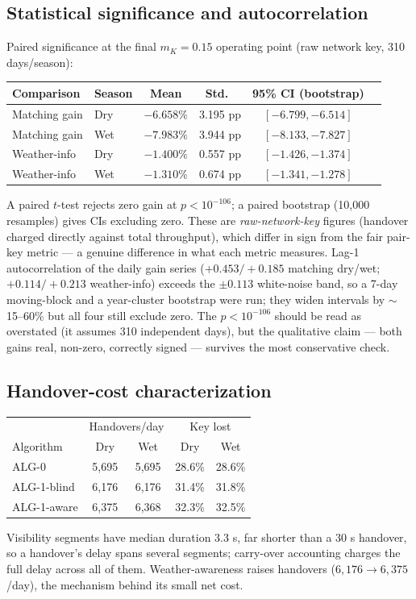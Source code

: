\subsection{Statistical significance and autocorrelation}
Paired significance at the final $m_K=0.15$ operating point (raw network key, 310 days/season):
\begin{center}\small
\begin{tabular}{@{}llcccl@{}}\toprule
Comparison & Season & Mean & Std.\ & 95\% CI (bootstrap) \\ \midrule
Matching gain & Dry & $-6.658\%$ & 3.195 pp & $[-6.799,-6.514]$ \\
Matching gain & Wet & $-7.983\%$ & 3.944 pp & $[-8.133,-7.827]$ \\
Weather-info & Dry & $-1.400\%$ & 0.557 pp & $[-1.426,-1.374]$ \\
Weather-info & Wet & $-1.310\%$ & 0.674 pp & $[-1.341,-1.278]$ \\ \bottomrule
\end{tabular}\end{center}
A paired $t$-test rejects zero gain at $p<10^{-106}$; a paired bootstrap (10{,}000 resamples) gives CIs excluding zero. These are \emph{raw-network-key} figures (handover charged directly against total throughput), which differ in sign from the fair pair-key metric --- a genuine difference in what each metric measures. Lag-1 autocorrelation of the daily gain series ($+0.453/+0.185$ matching dry/wet; $+0.114/+0.213$ weather-info) exceeds the $\pm0.113$ white-noise band, so a 7-day moving-block and a year-cluster bootstrap were run; they widen intervals by $\sim$15--60\% but all four still exclude zero. The $p<10^{-106}$ should be read as overstated (it assumes 310 independent days), but the qualitative claim --- both gains real, non-zero, correctly signed --- survives the most conservative check.

\subsection{Handover-cost characterization}
\begin{center}\small
\begin{tabular}{@{}lcccc@{}}\toprule
& \multicolumn{2}{c}{Handovers/day} & \multicolumn{2}{c}{Key lost} \\
Algorithm & Dry & Wet & Dry & Wet \\ \midrule
ALG-0 & 5{,}695 & 5{,}695 & 28.6\% & 28.6\% \\
ALG-1-blind & 6{,}176 & 6{,}176 & 31.4\% & 31.8\% \\
ALG-1-aware & 6{,}375 & 6{,}368 & 32.3\% & 32.5\% \\ \bottomrule
\end{tabular}\end{center}
Visibility segments have median duration 3.3 s, far shorter than a 30 s handover, so a handover's delay spans several segments; carry-over accounting charges the full delay across all of them. Weather-awareness raises handovers ($6{,}176\to6{,}375$/day), the mechanism behind its small net cost.

